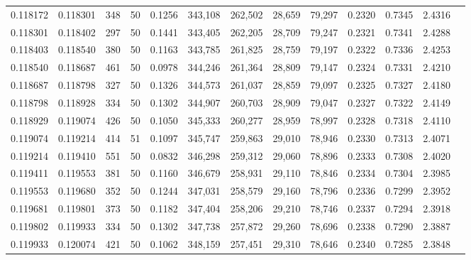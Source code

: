 \begin{tabular}{rrrrrrrrrrrrr}
0.118172 & 0.118301 &   348 &  50 &                                     0.1256 & 343,108 & 262,502 &  28,659 &  79,297 & 0.2320 & 0.7345 & 2.4316 \\
0.118301 & 0.118402 &   297 &  50 &                                     0.1441 & 343,405 & 262,205 &  28,709 &  79,247 & 0.2321 & 0.7341 & 2.4288 \\
0.118403 & 0.118540 &   380 &  50 &                                     0.1163 & 343,785 & 261,825 &  28,759 &  79,197 & 0.2322 & 0.7336 & 2.4253 \\
0.118540 & 0.118687 &   461 &  50 &                                     0.0978 & 344,246 & 261,364 &  28,809 &  79,147 & 0.2324 & 0.7331 & 2.4210 \\
0.118687 & 0.118798 &   327 &  50 &                                     0.1326 & 344,573 & 261,037 &  28,859 &  79,097 & 0.2325 & 0.7327 & 2.4180 \\
0.118798 & 0.118928 &   334 &  50 &                                     0.1302 & 344,907 & 260,703 &  28,909 &  79,047 & 0.2327 & 0.7322 & 2.4149 \\
0.118929 & 0.119074 &   426 &  50 &                                     0.1050 & 345,333 & 260,277 &  28,959 &  78,997 & 0.2328 & 0.7318 & 2.4110 \\
0.119074 & 0.119214 &   414 &  51 &                                     0.1097 & 345,747 & 259,863 &  29,010 &  78,946 & 0.2330 & 0.7313 & 2.4071 \\
0.119214 & 0.119410 &   551 &  50 &                                     0.0832 & 346,298 & 259,312 &  29,060 &  78,896 & 0.2333 & 0.7308 & 2.4020 \\
0.119411 & 0.119553 &   381 &  50 &                                     0.1160 & 346,679 & 258,931 &  29,110 &  78,846 & 0.2334 & 0.7304 & 2.3985 \\
0.119553 & 0.119680 &   352 &  50 &                                     0.1244 & 347,031 & 258,579 &  29,160 &  78,796 & 0.2336 & 0.7299 & 2.3952 \\
0.119681 & 0.119801 &   373 &  50 &                                     0.1182 & 347,404 & 258,206 &  29,210 &  78,746 & 0.2337 & 0.7294 & 2.3918 \\
0.119802 & 0.119933 &   334 &  50 &                                     0.1302 & 347,738 & 257,872 &  29,260 &  78,696 & 0.2338 & 0.7290 & 2.3887 \\
0.119933 & 0.120074 &   421 &  50 &                                     0.1062 & 348,159 & 257,451 &  29,310 &  78,646 & 0.2340 & 0.7285 & 2.3848 \\

\end{tabular}

